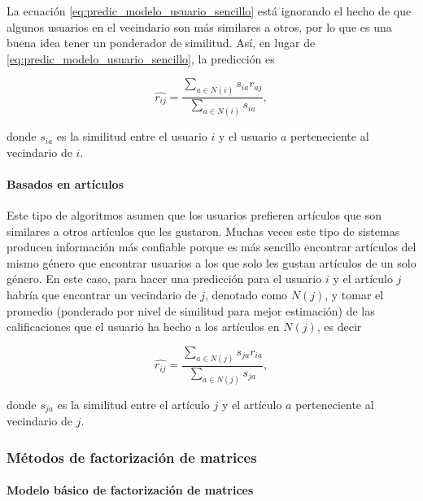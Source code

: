 La ecuación \ref{eq:predic_modelo_usuario_sencillo} está ignorando el hecho de que algunos usuarios en el vecindario son más similares a otros, por lo que es una buena idea tener un ponderador de similitud. Así, en lugar de \ref{eq:predic_modelo_usuario_sencillo}, la predicción es

\begin{equation}\label{eq:predic_modelo_usuario_ponderado}
 \hat{r_{ij}} = \frac{\sum_{a \in N(i)} s_{ia} r_{aj}}{\sum_{a \in N(i)} s_{ia}},
\end{equation}

donde $s_{ia}$ es la similitud entre el usuario $i$ y el usuario $a$ perteneciente al vecindario de $i$.

\paragraph{Basados en artículos}

Este tipo de algoritmos asumen que los usuarios prefieren artículos que son similares a otros artículos que les gustaron. Muchas veces este tipo de sistemas producen información más confiable porque es más sencillo encontrar artículos del mismo género que encontrar usuarios a los que solo les gustan artículos de un solo género. En este caso, para hacer una predicción para el usuario $i$ y el artículo $j$ habría que encontrar un vecindario de $j$, denotado como $N(j)$, y tomar el promedio (ponderado por nivel de similitud para mejor estimación) de las calificaciones que el usuario ha hecho a los artículos en $N(j)$, es decir

\begin{equation}\label{predic_modelo_articulo_ponderado}
 \hat{r_{ij}} = \frac{\sum_{a \in N(j)} s_{ja} r_{ia}}{\sum_{a \in N(j)} s_{ja}},
\end{equation}

donde $s_{ja}$ es la similitud entre el artículo $j$ y el artículo $a$ perteneciente al vecindario de $j$.


\subsubsection{Métodos de factorización de matrices} \label{sec:modelo_factorizacion}

\paragraph{Modelo básico de factorización de matrices}

